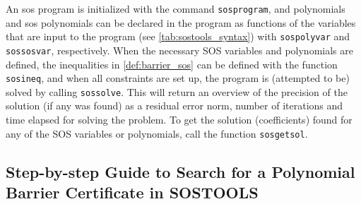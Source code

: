 \vspace{-2mm}
An \gls{sos} program is initialized with the command \texttt{sosprogram}, and polynomials and \gls{sos} polynomials can be declared in the program as functions of the variables that are input to the program (see \autoref{tab:sostools_syntax}) with \texttt{sospolyvar} and \texttt{sossosvar}, respectively.
%
%
When the necessary SOS variables and polynomials are defined, the inequalities in \autoref{def:barrier_sos} can be defined with the function \texttt{sosineq}, and when all constraints are set up, the program is (attempted to be) solved by calling \texttt{sossolve}. This will return an overview of the precision of the solution (if any was found) as a residual error norm, number of iterations and time elapsed for solving the problem. To get the solution (coefficients) found for any of the SOS variables or polynomials, call the function \texttt{sosgetsol}.






\subsection{Step-by-step Guide to Search for a Polynomial Barrier Certificate in SOSTOOLS}\label{sec:app_sostools_barrier_search}
\vspace{-2mm}

